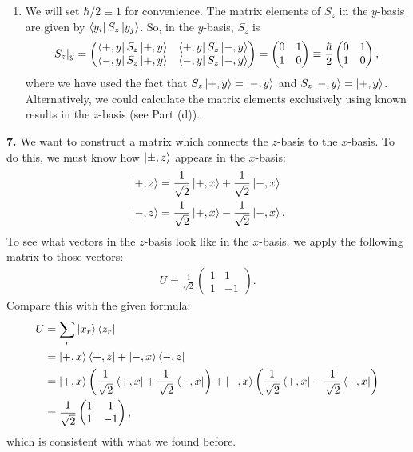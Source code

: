 \documentclass{article}
\theoremstyle{definition}
\newcommand{\f}[2]{\frac{#1}{#2}}
\newcommand{\lp}{\left(}
\newcommand{\rp}{\right)}
\begin{document}
\begin{enumerate}[label=(\alph*)]
	\item We will set $\hbar/2 \equiv 1$ for convenience. The matrix elements of $S_z$ in the $y$-basis are given by $\bra{y_i} S_z \ket{y_j}$. So, in the $y$-basis, $S_z$ is 
	\begin{align*}
	S_z\vert_y = \begin{pmatrix}
	\bra{+,y} S_z \ket{+,y} & \bra{+,y} S_z \ket{-,y} \\
	\bra{-,y} S_z \ket{+,y} & \bra{-,y} S_z \ket{-,y}
	\end{pmatrix} 
	= \begin{pmatrix}
	0 & 1\\ 1 & 0
	\end{pmatrix} \equiv \f{\hbar}{2} \begin{pmatrix}
	0 & 1\\ 1 & 0
	\end{pmatrix},
	\end{align*}
	where we have used the fact that $S_z \ket{+,y} = \ket{-,y}$ and $S_z\ket{-,y} = \ket{+,y}$. Alternatively, we could calculate the matrix elements exclusively using known results in the $z$-basis (see Part (d)). 
	
\end{enumerate}


\noindent \textbf{7.} We want to construct a matrix which connects the $z$-basis to the $x$-basis. To do this, we must know how $\ket{\pm,z}$ appears in the $x$-basis:
\begin{align*}
&\ket{+,z} = \f{1}{\sqrt{2}} \ket{+,x} + \f{1}{\sqrt{2}}\ket{-,x}\\
&\ket{-,z} = \f{1}{\sqrt{2}} \ket{+,x} - \f{1}{\sqrt{2}}\ket{-,x}.
\end{align*}
To see what vectors in the $z$-basis look like in  the $x$-basis, we apply the following matrix to those vectors:
\begin{align*}
U = \f{1}{\sqrt{2}}\begin{pmatrix}
1 & 1 \\ 1 & -1
\end{pmatrix}.
\end{align*}
Compare this with the given formula:
\begin{align*}
U &= \sum_r \ket{x_r}\bra{z_r}\\
&= \ket{+,x}\bra{+,z} + \ket{-,x}\bra{-,z} \\
&= \ket{+,x}\lp \f{1}{\sqrt{2}} \bra{+,x} + \f{1}{\sqrt{2}}\bra{-,x} \rp + \ket{-,x} \lp \f{1}{\sqrt{2}} \bra{+,x} - \f{1}{\sqrt{2}}\bra{-,x} \rp\\
&= \f{1}{\sqrt{2}}\begin{pmatrix}
1 & 1 \\ 1 & -1
\end{pmatrix},
\end{align*}
which is consistent with what we found before. 
	
\end{document}
